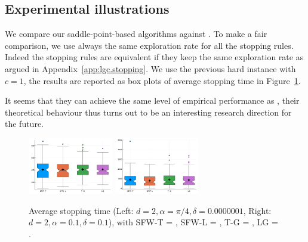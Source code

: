 \subsection{Experimental illustrations}

We compare our saddle-point-based algorithms against \LGapE{}. To make a fair comparison, we use always the same exploration rate for all the stopping rules. Indeed the stopping rules are equivalent if they keep the same exploration rate as argued in Appendix~\ref{app:lgc.stopping}. We use the previous hard instance with $c=1$, the results are reported as box plots of average stopping time in Figure~\ref{fig:exp1}.

It seems that they can achieve the same level of empirical performance as \LGapE{}, their theoretical behaviour thus turns out to be an interesting research direction for the future.

\begin{figure}[ht]
    \centering
    \includegraphics[width=0.33\textwidth]{Chapter4/img/exp_sin_-0000001}
    \includegraphics[width=0.33\textwidth]{Chapter4/img/exp_sin_-1}
    \caption{Average stopping time (Left: $d=2,\alpha=\pi/4,\delta=0.0000001$, Right: $d=2,\alpha=0.1,\delta=0.1$), with SFW-T = \SLTCC{}, SFW-L = \SLGapE{}, T-G = \LTCC{}, LG = \LGapE{}.}
    \label{fig:exp1}
\end{figure}
